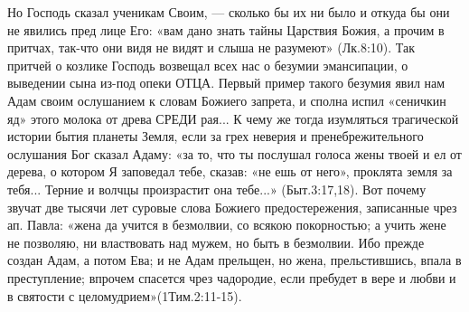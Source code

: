       Но Господь сказал ученикам Своим, --- сколько бы их ни было и откуда бы они не явились пред лице Его: «вам дано знать тайны Царствия Божия, а прочим в притчах, так-что они видя не видят и слыша не разумеют» (Лк.8:10). Так притчей о козлике Господь возвещал всех нас о безумии эмансипации, о выведении сына из-под опеки ОТЦА. Первый пример такого безумия явил нам Адам своим ослушанием к словам Божиего запрета, и сполна испил «сеничкин яд» этого молока от древа  СРЕДИ  рая...
      К чему же тогда изумляться трагической истории бытия планеты Земля, если за грех неверия и пренебрежительного ослушания Бог сказал Адаму: «за то, что ты послушал голоса жены твоей и ел от дерева, о котором Я заповедал тебе, сказав:  «не ешь от него»,  проклята земля за тебя... Терние и волчцы произрастит она тебе...» (Быт.3:17,18).  Вот почему звучат две тысячи лет суровые слова Божиего предостережения, записанные чрез ап. Павла: «жена да учится в безмолвии, со всякою покорностью; а учить жене не позволяю, ни властвовать над мужем, но быть в безмолвии. Ибо прежде создан Адам, а потом Ева; и не Адам прельщен, но жена, прельстившись, впала в преступление; впрочем спасется чрез чадородие, если пребудет в вере и любви и в святости с целомудрием»(1Тим.2:11-15).

